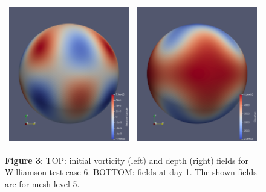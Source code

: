 \documentclass[a4paper]{article}
\begin{document}
\begin{figure}[t]
\begin{tabular}{cc}
 \hspace{-0em}\includegraphics[scale=0.125]{Images/vorticity_24.png} &
 \hspace{-0em}\includegraphics[scale=0.125]{Images/elevation_24.png} \\
 \end{tabular}\vspace{-10pt}
  \caption*{{\bfseries Figure 3}: TOP: initial vorticity (left) and depth (right) fields
  for Williamson test case 6. BOTTOM: fields at day 1. The shown fields are for mesh level 5.
  }
  \end{figure}
\end{document}
